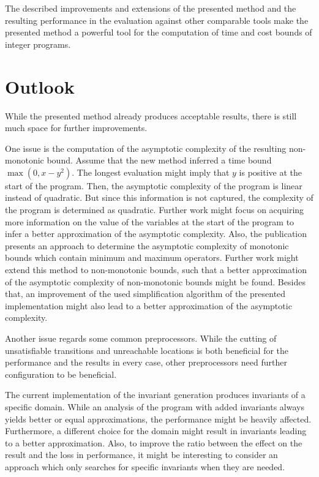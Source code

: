 The described improvements and extensions of the presented method and the resulting performance in the evaluation against other comparable tools make the presented method a powerful tool for the computation of time and cost bounds of integer programs.

\section{Outlook}

While the presented method already produces acceptable results, there is still much space for further improvements.

One issue is the computation of the asymptotic complexity of the resulting non-monotonic bound.
Assume that the new method inferred a time bound $\max(0,x-y^2)$.
The longest evaluation might imply that $y$ is positive at the start of the program.
Then, the asymptotic complexity of the program is linear instead of quadratic.
But since this information is not captured, the complexity of the program is determined as quadratic.
Further work might focus on acquiring more information on the value of the variables at the start of the program to infer a better approximation of the asymptotic complexity.
Also, the publication \cite{albert2009asymptotic} presents an approach to determine the asymptotic complexity of monotonic bounds which contain minimum and maximum operators.
Further work might extend this method to non-monotonic bounds, such that a better approximation of the asymptotic complexity of non-monotonic bounds might be found.
Besides that, an improvement of the used simplification algorithm of the presented implementation might also lead to a better approximation of the asymptotic complexity.

Another issue regards some common preprocessors.
While the cutting of unsatisfiable transitions and unreachable locations is both beneficial for the performance and the results in every case, other preprocessors need further configuration to be beneficial.

The current implementation of the invariant generation produces invariants of a specific domain.
While an analysis of the program with added invariants always yields better or equal approximations, the performance might be heavily affected.
Furthermore, a different choice for the domain might result in invariants leading to a better approximation.
Also, to improve the ratio between the effect on the result and the loss in performance, it might be interesting to consider an approach which only searches for specific invariants when they are needed.

